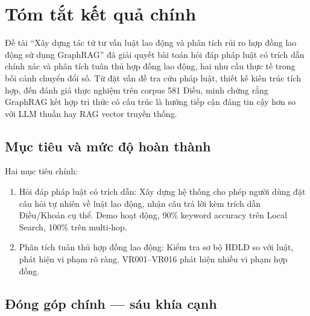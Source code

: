 \documentclass[../DoAn.tex]{subfiles}
\begin{document}
\section{Tóm tắt kết quả chính}
\label{section:6.1}

Đề tài ``Xây dựng tác tử tư vấn luật lao động và phân tích rủi ro hợp đồng lao động sử dụng GraphRAG'' đã giải quyết bài toán hỏi đáp pháp luật có trích dẫn chính xác và phân tích tuân thủ hợp đồng lao động, hai nhu cầu thực tế trong bối cảnh chuyển đổi số. Từ đặt vấn đề tra cứu pháp luật, thiết kế kiến trúc tích hợp, đến đánh giá thực nghiệm trên corpus 581 Điều, minh chứng rằng GraphRAG kết hợp tri thức có cấu trúc là hướng tiếp cận đáng tin cậy hơn so với \gls{LLM} thuần hay \gls{RAG} vector truyền thống.

\subsection{Mục tiêu và mức độ hoàn thành}
\label{subsection:6.1.1}

Hai mục tiêu chính:
\begin{enumerate}[nosep, leftmargin=*]
    \item Hỏi đáp pháp luật có trích dẫn: Xây dựng hệ thống cho phép người dùng đặt câu hỏi tự nhiên về luật lao động, nhận câu trả lời kèm trích dẫn Điều/Khoản cụ thể. Demo hoạt động, 90\% keyword accuracy trên Local Search, 100\% trên multi-hop.
    
    \item Phân tích tuân thủ hợp đồng lao động: Kiểm tra sơ bộ HĐLĐ so với luật, phát hiện vi phạm rõ ràng. VR001--VR016 phát hiện nhiều vi phạm hợp đồng.
\end{enumerate}

\subsection{Đóng góp chính --- sáu khía cạnh}
\label{subsection:6.1.2}
\end{document}
